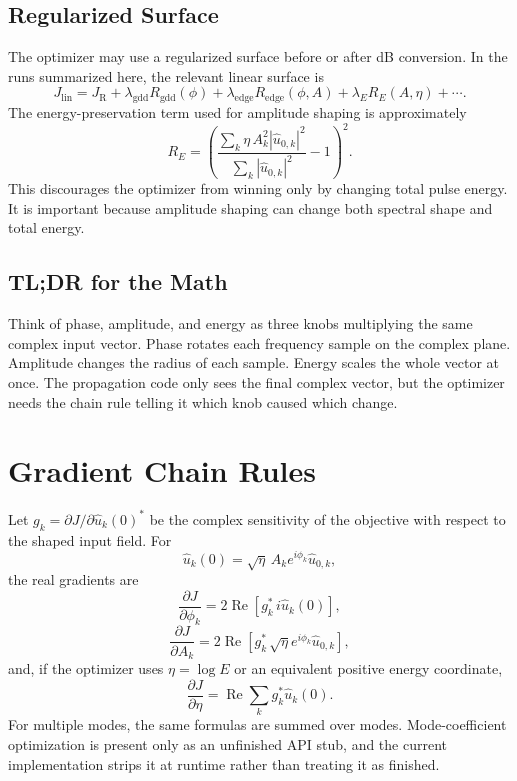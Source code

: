 \documentclass[11pt]{article}
\newcommand{\Avar}{A}
\newcommand{\Escale}{\eta}
\begin{document}
\subsection*{Regularized Surface}
The optimizer may use a regularized surface before or after dB conversion. In the runs summarized here, the relevant linear surface is
\[
    J_{\mathrm{lin}}
    =
    J_{\mathrm{R}}
    +\lambda_{\mathrm{gdd}}R_{\mathrm{gdd}}(\phi)
    +\lambda_{\mathrm{edge}}R_{\mathrm{edge}}(\phi,\Avar)
    +\lambda_E R_E(\Avar,\Escale)
    +\cdots .
\]
The energy-preservation term used for amplitude shaping is approximately
\[
    R_E =
    \left(
    \frac{\sum_k \Escale\,\Avar_k^2|\hat u_{0,k}|^2}
         {\sum_k |\hat u_{0,k}|^2}
    -1
    \right)^2.
\]
This discourages the optimizer from winning only by changing total pulse energy. It is important because amplitude shaping can change both spectral shape and total energy.

\subsection*{TL;DR for the Math}
Think of phase, amplitude, and energy as three knobs multiplying the same complex input vector. Phase rotates each frequency sample on the complex plane. Amplitude changes the radius of each sample. Energy scales the whole vector at once. The propagation code only sees the final complex vector, but the optimizer needs the chain rule telling it which knob caused which change.

\section{Gradient Chain Rules}
Let $g_k=\partial J/\partial \hat u_k(0)^*$ be the complex sensitivity of the objective with respect to the shaped input field. For
\[
    \hat u_k(0)=\sqrt{\Escale}\,\Avar_k e^{i\phi_k}\hat u_{0,k},
\]
the real gradients are
\[
    \frac{\partial J}{\partial \phi_k}
    =
    2\operatorname{Re}\left[g_k^*\,i\hat u_k(0)\right],
\]
\[
    \frac{\partial J}{\partial \Avar_k}
    =
    2\operatorname{Re}\left[
    g_k^*\,\sqrt{\Escale}e^{i\phi_k}\hat u_{0,k}
    \right],
\]
and, if the optimizer uses $\eta=\log E$ or an equivalent positive energy coordinate,
\[
    \frac{\partial J}{\partial \eta}
    =
    \operatorname{Re}\sum_k g_k^*\hat u_k(0).
\]
For multiple modes, the same formulas are summed over modes. Mode-coefficient optimization is present only as an unfinished API stub, and the current implementation strips it at runtime rather than treating it as finished.
\end{document}

